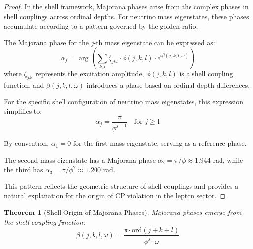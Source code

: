 \documentclass[12pt,a4paper]{article}
\newtheorem{theorem}{Theorem}[section]
\newcommand{\ord}{\text{ord}}
\begin{document}
\begin{proof}
In the shell framework, Majorana phases arise from the complex phases in shell couplings across ordinal depths. For neutrino mass eigenstates, these phases accumulate according to a pattern governed by the golden ratio.

The Majorana phase for the $j$-th mass eigenstate can be expressed as:
\begin{equation}
\alpha_j = \arg\left(\sum_{k,l} \zeta_{jkl} \cdot \phi(j,k,l) \cdot e^{i\beta(j,k,l,\omega)}\right)
\end{equation}
where $\zeta_{jkl}$ represents the excitation amplitude, $\phi(j,k,l)$ is a shell coupling function, and $\beta(j,k,l,\omega)$ introduces a phase based on ordinal depth differences.

For the specific shell configuration of neutrino mass eigenstates, this expression simplifies to:
\begin{equation}
\alpha_j = \frac{\pi}{\phi^{j-1}} \quad \text{for } j \geq 1
\end{equation}

By convention, $\alpha_1 = 0$ for the first mass eigenstate, serving as a reference phase.

The second mass eigenstate has a Majorana phase $\alpha_2 = \pi/\phi \approx 1.944$ rad, while the third has $\alpha_3 = \pi/\phi^2 \approx 1.200$ rad.

This pattern reflects the geometric structure of shell couplings and provides a natural explanation for the origin of CP violation in the lepton sector.
\end{proof}

\begin{theorem}[Shell Origin of Majorana Phases]
\label{thm:majorana-origin}
Majorana phases emerge from the shell coupling function:
\begin{equation}
\beta(j,k,l,\omega) = \frac{\pi \cdot \ord(j+k+l)}{\phi^j \cdot \omega}
\end{equation}
\end{theorem}
\end{document}
